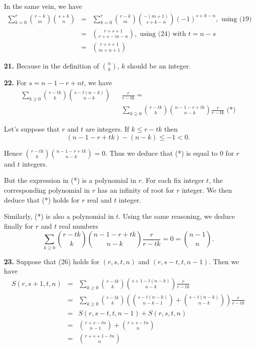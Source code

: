 \documentclass[a4paper,12pt]{article}
\newcommand{\newpar}[1]{\bigskip \noindent \textbf{#1.}}
\begin{document}
In the same vein, we have
\begin{eqnarray*}
  \sum_{k=0}^r {{r-k} \choose m} {{s+k} \choose n} &=& \sum_{k=0}^r
      {{r-k} \choose m}
  {{-(m+1)} \choose {s+k-n}} (-1)^{s+k-n}, \mbox{ using (19)} \\
  &=& {{r+s+1} \choose {r+s-m-n}}, \mbox{ using (24) with $t = n-s$} \\
  &=& {{r+s+1} \choose {m+n+1}}
\end{eqnarray*}

\newpar{21} Because in the definition of ${n \choose k}$, $k$ should be an
integer.

\newpar{22} For $s = n-1-r+nt$, we have
\begin{eqnarray*}
  \sum_{k\ge 0} {{r-tk} \choose k} {{s-t(n-k)} \choose {n-k}} &&
  \frac{r}{r-tk} = \\ &&\sum_{k\ge 0} {{r-tk} \choose k}
       {{n-1-r+tk} \choose {n-k}} \frac{r}{r-tk} \mbox{ (*)}
\end{eqnarray*}

Let's suppose that $r$ and $t$ are integers. If $k \le r - tk$ then
\[ (n-1-r+tk) - (n-k) \le -1 < 0.\]

Hence ${{r-tk} \choose k} {{n-1-r+tk} \choose {n-k}} = 0$.  Thus we deduce that (*) is
equal to $0$ for $r$ and $t$ integers.

But the expression in (*) is a polynomial in $r$.  For each fix integer
$t$, the corresponding polynomial in $r$ has an infinity of root for
$r$ integer.  We then deduce that (*) holds for $r$ real and $t$
integer.

Similarly, (*) is also a polynomial in $t$.  Using the same reasoning,
we deduce finally for $r$ and $t$ real numbers
\[\sum_{k\ge 0} {{r-tk} \choose k} {{n-1-r+tk} \choose {n-k}}
\frac{r}{r-tk} = 0 = {{n-1} \choose n}.\]

\newpar{23}  Suppose that (26) holds for $(r,s,t,n)$ and
$(r,s-t,t,n-1)$.  Then we have
\begin{eqnarray*}
  S(r,s+1,t,n) &=& \sum_{k\ge 0} {{r-tk} \choose k} {{s+1-t(n-k)}
    \choose {n-k}}
  \frac{r}{r-tk}\\
  &=& \sum_{k\ge 0} {{r-tk} \choose k} \left( {{s-t(n-k)} \choose {n-k-1}} +
  {{s-t(n-k)} \choose {n-k}}\right) \frac{r}{r-tk} \\
  &=& S(r,s-t,t,n-1) + S(r,s,t,n) \\
  &=& {{r+s-tn} \choose {n-1}} + {{r+s-tn} \choose n} \\
  &=& {{r+s+1-tn} \choose n}
\end{eqnarray*}
\end{document}
